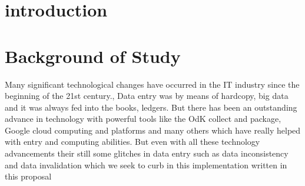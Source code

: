 \documentclass[12pt,]{article}
\begin{document}

\newpage




\section{introduction}
\section*{Background of Study}
Many significant technological changes have occurred in the IT industry since the beginning of the 21st century., Data entry was by means of hardcopy, big data and it was always fed into the books, ledgers. But there has been an outstanding advance in technology with powerful tools like the OdK collect and package, Google cloud computing and platforms and many others which have really helped with entry and computing abilities. But even with all these technology advancements their still some glitches in data entry such as data inconsistency and data invalidation which we seek to curb in this implementation written in this proposal
\end{document}
